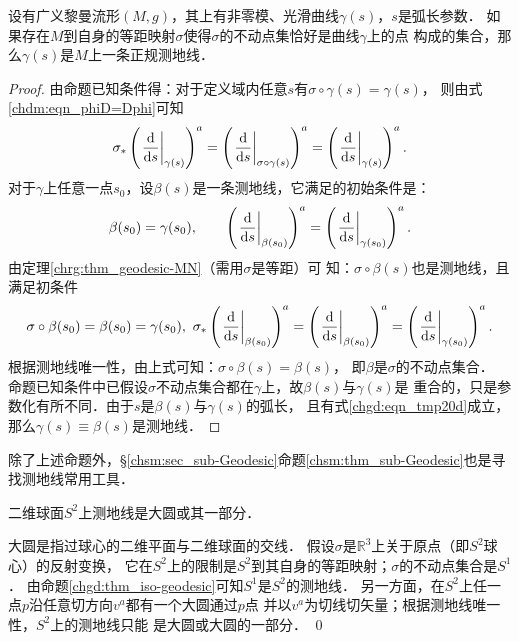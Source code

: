 \begin{proposition}\label{chgd:thm_iso-geodesic}
    设有广义黎曼流形$(M,g)$，其上有非零模、光滑曲线$\gamma(s)$，$s$是弧长参数．
    如果存在$M$到自身的等距映射$\sigma$使得$\sigma$的不动点集恰好是曲线$\gamma$上的点
    构成的集合，那么$\gamma(s)$是$M$上一条正规测地线．
\end{proposition}
\begin{proof}
    由命题已知条件得：对于定义域内任意$s$有$\sigma\circ \gamma(s) = \gamma(s)$，
    则由式\eqref{chdm:eqn_phiD=Dphi}可知
    \begin{equation}
        \sigma_{*}\left(\left.\frac{{\rm d}  }{{\rm d} s}\right|_{\gamma(s)}\right)^a
        = \left(\left.\frac{{\rm d}  }{{\rm d} s}\right|_{\sigma\circ\gamma(s)}\right)^a
        = \left(\left.\frac{{\rm d}  }{{\rm d} s}\right|_{\gamma(s)}\right)^a .
    \end{equation}
    对于$\gamma$上任意一点$s_0$，设$\beta(s)$是一条测地线，它满足的初始条件是：
    \begin{equation}\label{chgd:eqn_tmp20d}
        \beta(s_0)=\gamma(s_0),\qquad 
        \left(\left.\frac{{\rm d}  }{{\rm d} s}\right|_{\beta(s_0)}\right)^a
        =\left(\left.\frac{{\rm d}  }{{\rm d} s}\right|_{\gamma(s_0)}\right)^a .
    \end{equation}
    由定理\ref{chrg:thm_geodesic-MN}（需用$\sigma$是等距）可
    知：$\sigma\circ \beta(s)$也是测地线，且满足初条件
    \begin{equation*}
        \sigma\circ\beta(s_0)=\beta(s_0)=\gamma(s_0),\
        \sigma_* \left(\left.\frac{{\rm d}  }{{\rm d} s}\right|_{\beta(s_0)}\right)^a
        =\left(\left.\frac{{\rm d}  }{{\rm d} s}\right|_{\beta(s_0)}\right)^a
        =\left(\left.\frac{{\rm d}  }{{\rm d} s}\right|_{\gamma(s_0)}\right)^a .
    \end{equation*}
    根据测地线唯一性，由上式可知：$\sigma\circ \beta(s) = \beta(s)$，
    即$\beta$是$\sigma$的不动点集合．
    命题已知条件中已假设$\sigma$不动点集合都在$\gamma$上，故$\beta(s)$与$\gamma(s)$是
    重合的，只是参数化有所不同．由于$s$是$\beta(s)$与$\gamma(s)$的弧长，
    且有式\eqref{chgd:eqn_tmp20d}成立，那么$\gamma(s)\equiv \beta(s)$是测地线．
\end{proof}


除了上述命题外，\S\ref{chsm:sec_sub-Geodesic}命题\ref{chsm:thm_sub-Geodesic}也是寻找测地线常用工具．


\begin{example}
    二维球面$S^2$上测地线是大圆或其一部分．
\end{example}
大圆是指过球心的二维平面与二维球面的交线．
假设$\sigma$是$\mathbb{R}^3$上关于原点（即$S^2$球心）的反射变换，
它在$S^2$上的限制是$S^2$到其自身的等距映射；$\sigma$的不动点集合是$S^1$．
由命题\ref{chgd:thm_iso-geodesic}可知$S^1$是$S^2$的测地线．
另一方面，在$S^2$上任一点$p$沿任意切方向$v^a$都有一个大圆通过$p$点
并以$v^a$为切线切矢量；根据测地线唯一性，$S^2$上的测地线只能
是大圆或大圆的一部分．
\qed


